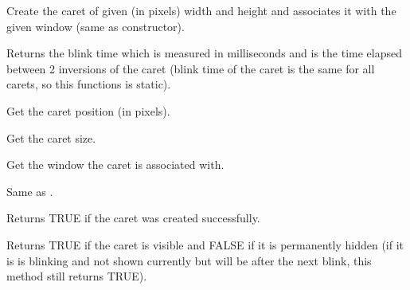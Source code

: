 Create the caret of given (in pixels) width and height and associates it
with the given window (same as constructor).

\label{wxcaretgetblinktime}


Returns the blink time which is measured in milliseconds and is the time elapsed
between 2 inversions of the caret (blink time of the caret is the same
for all carets, so this functions is static).

\label{wxcaretgetposition}



Get the caret position (in pixels).

\label{wxcaretgetsize}



Get the caret size.

\label{wxcaretgetwindow}


Get the window the caret is associated with.

\label{wxcarethide}


Same as .

\label{wxcaretisok}


Returns TRUE if the caret was created successfully.

\label{wxcaretisvisible}


Returns TRUE if the caret is visible and FALSE if it is permanently
hidden (if it is is blinking and not shown currently but will be after the
next blink, this method still returns TRUE).

\label{wxcaretmove}


